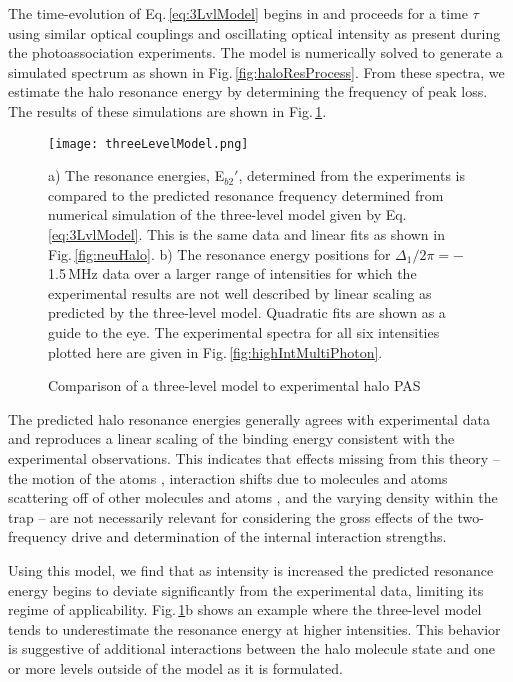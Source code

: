 The time-evolution of Eq.\,\ref{eq:3LvlModel} begins in  and proceeds for a time $\tau$ using similar optical couplings and oscillating optical intensity as present during the photoassociation experiments.
The model is numerically solved to generate a simulated spectrum as shown in Fig.\,\ref{fig:haloResProcess}.
From these spectra, we estimate the halo resonance energy by determining the frequency of peak loss.
The results of these simulations are shown in Fig.\,\ref{fig:3LvlModel}.
	\begin{figure}
		\centerline{
		\texttt{[image: threeLevelModel.png]}}
		\caption{Comparison of a three-level model to experimental halo PAS}{a) The resonance energies, E$_{b2}'$, determined from the experiments is compared to the predicted resonance frequency determined from numerical simulation of the three-level model given by Eq.\,\ref{eq:3LvlModel}. This is the same data and linear fits as shown in Fig.\,\ref{fig:neuHalo}. b) The resonance energy positions for $\Delta_1/2 \pi = -$1.5\,MHz data over a larger range of intensities for which the experimental results are not well described by linear scaling as predicted by the three-level model. Quadratic fits are shown as a guide to the eye. The experimental spectra for all six intensities plotted here are given in Fig.\,\ref{fig:highIntMultiPhoton}.}
		\label{fig:3LvlModel}
	\end{figure} 
The predicted halo resonance energies generally agrees with experimental data and reproduces a linear scaling of the binding energy consistent with the experimental observations.
This indicates that effects missing from this theory – the motion of the atoms \cite{Bohn1996,Bohn1999}, interaction shifts due to molecules and atoms scattering off of other molecules and atoms \cite{Wynar2000}, and the varying density within the trap \cite{MartinezDeEscobar2008} – are not necessarily relevant for considering the gross effects of the two-frequency drive and determination of the internal interaction strengths.

Using this model, we find that as intensity is increased the predicted resonance energy begins to deviate significantly from the experimental data, limiting its regime of applicability.
Fig.\,\ref{fig:3LvlModel}b shows an example where the three-level model tends to underestimate the resonance energy at higher intensities.
This behavior is suggestive of additional interactions between the halo molecule state and one or more levels outside of the model as it is formulated.

